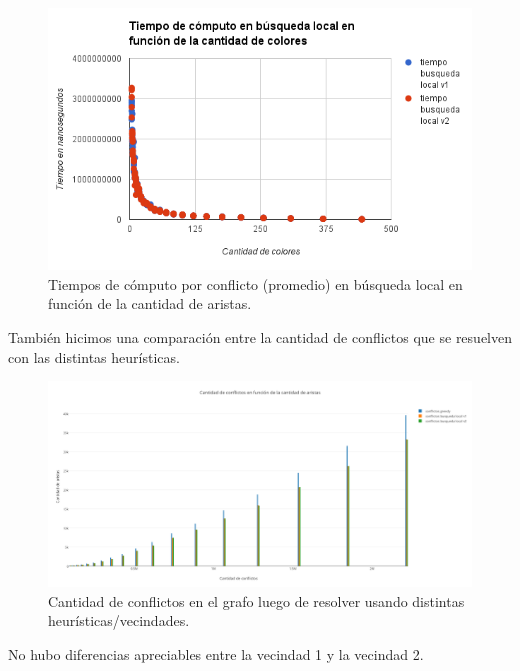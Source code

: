   \begin{figure}[H]
	\centering
 	\includegraphics[width=18cm]{imagenes/Ej4/TvsColores.png}
	\caption{Tiempos de cómputo por conflicto (promedio) en búsqueda local en función de la cantidad de aristas.}
	\label{aristasEj4-2}
 \end{figure}
 
 También hicimos una comparación entre la cantidad de conflictos que se resuelven con las distintas heurísticas.
 
  \begin{figure}[H]
	\centering
 	\includegraphics[width=18cm]{imagenes/Ej4/conflictosVsAristas.png}
	\caption{Cantidad de conflictos en el grafo luego de resolver usando distintas heurísticas/vecindades.}
	\label{conflictosEj4}
 \end{figure}
 
 No hubo diferencias apreciables entre la vecindad 1 y la vecindad 2.